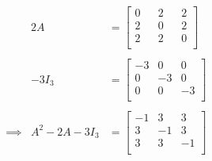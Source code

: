 \documentclass[11pt]{amsbook}
\begin{document}
\begin{align*}
&&  2A & = 
	\begin{bmatrix}
		0  &&   2    &&  2\\
		2  &&   0    &&   2\\
		2  &&   2    &&  0\\
	\end{bmatrix} 
&&\\
 \\ 
&&  -3I_3 & =
	\begin{bmatrix}
		-3  &   0    &   0\\
		0  &   -3    &   0\\
		0  &   0    &   -3\\
	\end{bmatrix} 
&&
\\
\\
&\implies   &  A^2-2A-3I_3 & = \begin{bmatrix}
-1  &   3    &   3\\
3  &   -1    &   3\\
3 &   3    &   -1\\
\end{bmatrix} 
 \end{align*}
 
\end{document}
